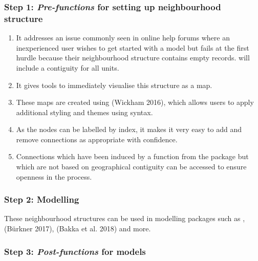 \hypertarget{step-1-pre-functions-for-setting-up-neighbourhood-structure}{%
\subsubsection{\texorpdfstring{Step 1: \emph{Pre-functions} for setting up neighbourhood structure}{Step 1: Pre-functions for setting up neighbourhood structure}}\label{step-1-pre-functions-for-setting-up-neighbourhood-structure}}

\begin{enumerate}
\def\labelenumi{\arabic{enumi}.}
\item
  It addresses an issue commonly seen in online help forums where an inexperienced user wishes to get started with a model but fails at the first hurdle because their neighbourhood structure contains empty records.  will include a contiguity for all units.
\item
  It gives tools to immediately visualise this structure as a map.
\item
  These maps are created using  (Wickham 2016), which allows users to apply additional styling and themes using  syntax.
\item
  As the nodes can be labelled by index, it makes it very easy to add and remove connections as appropriate with confidence.
\item
  Connections which have been induced by a function from the package but which are not based on geographical contiguity can be accessed to ensure openness in the process.
\end{enumerate}

\hypertarget{step-2-modelling}{%
\subsubsection{Step 2: Modelling}\label{step-2-modelling}}

These neighbourhood structures can be used in modelling packages such as ,  (Bürkner 2017),  (Bakka et al. 2018) and more.

\hypertarget{step-3-post-functions-for-models}{%
\subsubsection{\texorpdfstring{Step 3: \emph{Post-functions} for models}{Step 3: Post-functions for models}}\label{step-3-post-functions-for-models}}

